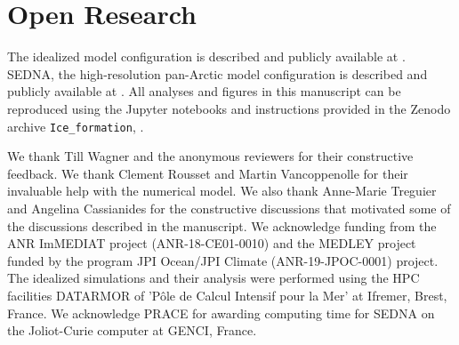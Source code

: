 \documentclass[draft]{agujournal2019}
\begin{document}
\section{Open Research}

The idealized model configuration is described and publicly available at \citet{martinez_moreno_2023_10205736}. SEDNA, the high-resolution pan-Arctic model configuration is described and publicly available at \citep{SEDNA_2023}.
All analyses and figures in this manuscript can be reproduced using the Jupyter notebooks and instructions provided in the Zenodo archive \texttt{Ice\_formation}, \citet{josue_martinez_moreno_2024_13358894}.

\acknowledgments

We thank Till Wagner and the anonymous reviewers for their constructive feedback.
We thank Clement Rousset and Martin Vancoppenolle for their invaluable help with the numerical model. We also thank Anne-Marie Treguier and Angelina Cassianides for the constructive discussions that motivated some of the discussions described in the manuscript.
We acknowledge funding from the ANR ImMEDIAT project (ANR-18-CE01-0010) and the MEDLEY project funded by the program JPI Ocean/JPI Climate (ANR-19-JPOC-0001) project. The idealized simulations and their analysis were performed using the HPC facilities DATARMOR of ’Pôle de Calcul Intensif pour la Mer’ at Ifremer, Brest, France. We acknowledge PRACE for awarding computing time for SEDNA on the Joliot-Curie computer at GENCI\makeatletter@CEA, France.

\nocite{*}

\end{document}
